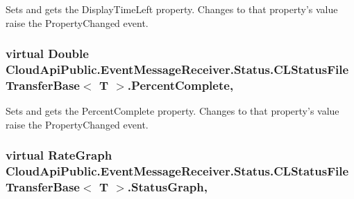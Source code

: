 Sets and gets the Display\-Time\-Left property. Changes to that property's value raise the Property\-Changed event. 

\hypertarget{class_cloud_api_public_1_1_event_message_receiver_1_1_status_1_1_c_l_status_file_transfer_base_3_01_t_01_4_a87dbed3acb80ba6ee5537f72db56a3b5}{
\subsubsection[{Percent\-Complete}]{\setlength{\rightskip}{0pt plus 5cm}virtual Double Cloud\-Api\-Public.\-Event\-Message\-Receiver.\-Status.\-C\-L\-Status\-File\-Transfer\-Base$<$ T $>$.Percent\-Complete\hspace{0.3cm}{\ttfamily [get]}, {\ttfamily [set]}}}\label{class_cloud_api_public_1_1_event_message_receiver_1_1_status_1_1_c_l_status_file_transfer_base_3_01_t_01_4_a87dbed3acb80ba6ee5537f72db56a3b5}


Sets and gets the Percent\-Complete property. Changes to that property's value raise the Property\-Changed event. 

\hypertarget{class_cloud_api_public_1_1_event_message_receiver_1_1_status_1_1_c_l_status_file_transfer_base_3_01_t_01_4_af999e868dc7c4d8cbd3f997b8352427f}{
\subsubsection[{Status\-Graph}]{\setlength{\rightskip}{0pt plus 5cm}virtual Rate\-Graph Cloud\-Api\-Public.\-Event\-Message\-Receiver.\-Status.\-C\-L\-Status\-File\-Transfer\-Base$<$ T $>$.Status\-Graph\hspace{0.3cm}{\ttfamily [get]}, {\ttfamily [set]}}}\label{class_cloud_api_public_1_1_event_message_receiver_1_1_status_1_1_c_l_status_file_transfer_base_3_01_t_01_4_af999e868dc7c4d8cbd3f997b8352427f}


